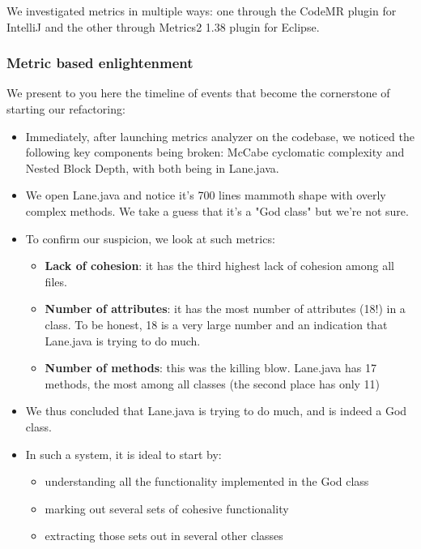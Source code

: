 We investigated metrics in multiple ways: one through the CodeMR plugin for IntelliJ and the other through Metrics2 1.38 plugin for Eclipse.

\subsubsection{Metric based enlightenment}

We present to you here the timeline of events that become the cornerstone of starting our refactoring:

\begin{itemize}

    \item Immediately, after launching metrics analyzer on the codebase, we noticed the following key components being broken: McCabe cyclomatic complexity and Nested Block Depth, with both being in Lane.java.
    \item We open Lane.java and notice it's 700 lines mammoth shape with overly complex methods. We take a guess that it's a "God class" but we're not sure.
    \item To confirm our suspicion, we look at such metrics:

          \begin{itemize}
              \item \textbf{Lack of cohesion}: it has the third highest lack of cohesion among all files.
              \item \textbf{Number of attributes}: it has the most number of attributes (18!) in a class. To be honest, 18 is a very large number and an indication that Lane.java is trying to do much.
              \item \textbf{Number of methods}: this was the killing blow. Lane.java has 17 methods, the most among all classes (the second place has only 11)
          \end{itemize}

    \item We thus concluded that Lane.java is trying to do much, and is indeed a God class.
    \item In such a system, it is ideal to start by:
          \begin{itemize}
              \item understanding all the functionality implemented in the God class
              \item marking out several sets of cohesive functionality
              \item extracting those sets out in several other classes
          \end{itemize}


\end{itemize}
